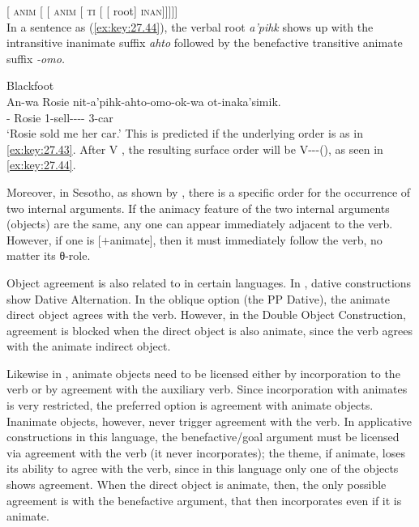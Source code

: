 \documentclass[output=paper]{langsci/langscibook}
\begin{document}
\ea\label{ex:key:27.43}
    [ \textsc{anim} [  \Ta{} [
    \textsc{anim}  [ \textsc{ti} [  [ root] \textsc{inan}]]]]]\\
\z
In a sentence as (\ref{ex:key:27.44}), the verbal root \emph{a'pihk} shows up with
the intransitive inanimate suffix \emph{ahto} followed by the benefactive
transitive animate suffix \emph{-omo.}

\ea\label{ex:key:27.44} Blackfoot \citep[67]{Bliss2010}\\
    \gll    An-wa     Rosie nit-a'pihk-ahto-omo-ok-wa ot-inaka'simik.\\
        \Dem-\Prox{} Rosie 1-sell-\Ti-\Ben-\Inv-\Prox{} 3-car\\
    \glt    `Rosie sold me her car.'
\z
This is predicted if the underlying order is as in \eqref{ex:key:27.43}. After
V , the resulting surface order will be V-\Ti-\Ta-(\Ben), as seen
in \eqref{ex:key:27.44}.

Moreover, in Sesotho, as shown by \textcite{DemuthMachobaneMoloiOdato2005},
there is a specific order for the occurrence of two internal arguments. If the
animacy feature of the two internal arguments (objects) are the same, any one
can appear immediately adjacent to the verb. However, if one is [$+$animate],
then it must immediately follow the verb, no matter its θ-role.

Object agreement is also related to  in certain languages. In
 \parencite{Hualde1989,Woolford2000}, dative constructions show
Dative Alternation.  In the oblique option (the PP Dative), the animate direct
object agrees with the verb. However, in the Double Object
Construction,
agreement is blocked when the direct object is also animate, since the verb
agrees with the animate indirect object.

Likewise in  \citep{Baker1996}, animate objects need to be licensed
either by incorporation to the verb or by agreement with the auxiliary verb.
Since incorporation with animates is very restricted, the preferred option is
agreement with animate objects. Inanimate objects, however, never trigger
agreement with the verb. In applicative constructions in this language, the
benefactive/goal argument must be licensed via agreement with the verb (it
never incorporates); the theme, if animate, loses its ability to agree with the
verb, since in this language only one of the objects shows agreement. When the
direct object is animate, then, the only possible agreement is with the
benefactive argument, that then incorporates even if it is animate.
\end{document}
